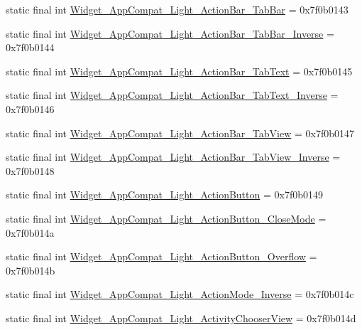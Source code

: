 \begin{CompactItemize}
\item 
static final int \hyperlink{classandroid_1_1support_1_1v7_1_1palette_1_1_r_1_1style_3755934c55d8eb74d5a63c5810bd44dd}{Widget\_\-AppCompat\_\-Light\_\-ActionBar\_\-TabBar} = 0x7f0b0143
\item 
static final int \hyperlink{classandroid_1_1support_1_1v7_1_1palette_1_1_r_1_1style_08f773cf4409984a1a7ad33a6651a32e}{Widget\_\-AppCompat\_\-Light\_\-ActionBar\_\-TabBar\_\-Inverse} = 0x7f0b0144
\item 
static final int \hyperlink{classandroid_1_1support_1_1v7_1_1palette_1_1_r_1_1style_acbb0748758d6ac9cbfff06c07411708}{Widget\_\-AppCompat\_\-Light\_\-ActionBar\_\-TabText} = 0x7f0b0145
\item 
static final int \hyperlink{classandroid_1_1support_1_1v7_1_1palette_1_1_r_1_1style_ccf5c6f8be9f33bf645f593940af5d41}{Widget\_\-AppCompat\_\-Light\_\-ActionBar\_\-TabText\_\-Inverse} = 0x7f0b0146
\item 
static final int \hyperlink{classandroid_1_1support_1_1v7_1_1palette_1_1_r_1_1style_81d295b92877ab7739f35a98491cc014}{Widget\_\-AppCompat\_\-Light\_\-ActionBar\_\-TabView} = 0x7f0b0147
\item 
static final int \hyperlink{classandroid_1_1support_1_1v7_1_1palette_1_1_r_1_1style_436726273dedc935688c336dc214ddd7}{Widget\_\-AppCompat\_\-Light\_\-ActionBar\_\-TabView\_\-Inverse} = 0x7f0b0148
\item 
static final int \hyperlink{classandroid_1_1support_1_1v7_1_1palette_1_1_r_1_1style_dd22ea431fa49c5b91f1dacea645de0b}{Widget\_\-AppCompat\_\-Light\_\-ActionButton} = 0x7f0b0149
\item 
static final int \hyperlink{classandroid_1_1support_1_1v7_1_1palette_1_1_r_1_1style_c0c26725a8c9e17761dcfcaffb51e5fe}{Widget\_\-AppCompat\_\-Light\_\-ActionButton\_\-CloseMode} = 0x7f0b014a
\item 
static final int \hyperlink{classandroid_1_1support_1_1v7_1_1palette_1_1_r_1_1style_ffbd8ac687434b10e8b9c1db6f0537ce}{Widget\_\-AppCompat\_\-Light\_\-ActionButton\_\-Overflow} = 0x7f0b014b
\item 
static final int \hyperlink{classandroid_1_1support_1_1v7_1_1palette_1_1_r_1_1style_c70f27772266b88c34941060407dff5a}{Widget\_\-AppCompat\_\-Light\_\-ActionMode\_\-Inverse} = 0x7f0b014c
\item 
static final int \hyperlink{classandroid_1_1support_1_1v7_1_1palette_1_1_r_1_1style_7b59110b4eabd6f03c85b7a9dc11d033}{Widget\_\-AppCompat\_\-Light\_\-ActivityChooserView} = 0x7f0b014d
\item 

\end{CompactItemize}
